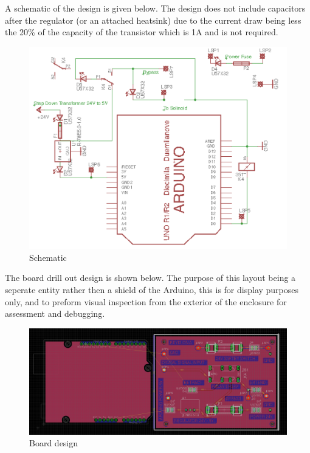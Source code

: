 \documentclass[a4paper, 10pt]{IEEEconf}
\begin{document}
A schematic of the design is given below. The design does not include capacitors after the regulator (or an attached heatsink) due to the current draw being less the 20\% of the capacity of the transistor which is 1A and is not required.

\begin{figure}[H]
  \includegraphics[width=\linewidth]{images/Schematic}
  \caption{Schematic}
  \label{fig:Schematic}
\end{figure}

The board drill out design is shown below. The purpose of this layout being a seperate entity rather then a shield of the Arduino, this is for display purposes only, and to preform visual inspection from the exterior of the enclosure for assessment and debugging. 

\begin{figure}[H]
  \includegraphics[width=\linewidth]{images/Board}
  \caption{Board design}
  \label{fig:Board design}
\end{figure}
\end{document}
